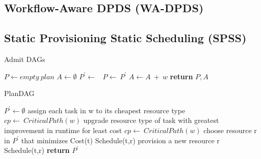 \documentclass{sig-alternate}
\begin{document}
\subsection{Workflow-Aware DPDS (WA-DPDS)}
\subsection{Static Provisioning Static Scheduling (SPSS)}

\begin{algorithm}
\caption{Admit DAGs}
\label{alg:admit}
\begin{algorithmic}[1]
    \State $P\gets empty\ plan$
    \State $A\gets \emptyset$ 
        \State $P^\prime \gets$\ 
                \State $P\gets\ P^\prime$ 
                \State $A \gets A\ +\ w$ 
            \EndIf
        \EndIf
    \EndFor
    \State \textbf{return} $P,A$
\EndProcedure
\end{algorithmic} 
\end{algorithm}


\begin{algorithm}
\caption{PlanDAG}
\label{alg:plandag}
\begin{algorithmic}[1]
    \State $P^\prime\gets \emptyset$
    \State assign each task in w to its cheapest resource type
    \State $cp \gets\ CriticalPath(w)$
        \State upgrade resource type of task with greatest improvement in runtime for least cost
        \State $cp \gets\ CriticalPath(w)$
    \EndWhile
    \State {}
        \State choose resource r in $P^\prime$ that minimizes Cost(t)
            \State Schedule(t,r)
        \Else
            \State provision a new resource r
            \State Schedule(t,r)
        \EndIf
    \EndFor
    \State \textbf{return} $P^\prime$
\EndProcedure
\end{algorithmic} 
\end{algorithm}
\end{document}
